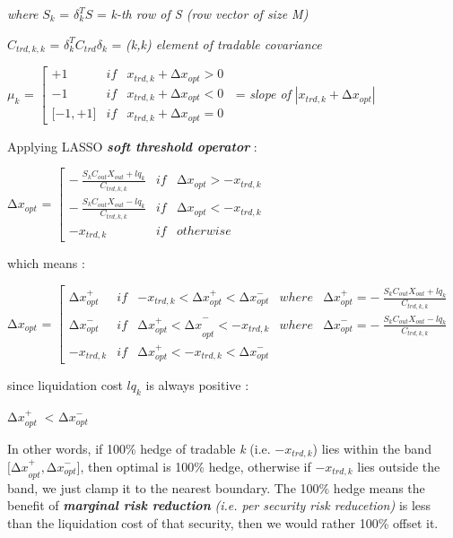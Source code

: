\emph{where} \(S_{k}\) = \(\delta_{k}^{T}S\) = \emph{k-th row of S (row
vector of size M)}

\(C_{trd,k,k}\) = \(\delta_{k}^{T}C_{trd}\delta_{k}\) = \emph{(k,k)
element of tradable covariance}

\(\mu_{k}\) = \(\left\lbrack \begin{matrix}
 + 1 & if & x_{trd,k} + {\mathrm{\Delta}x}_{opt} > 0 \\
 - 1 & if & x_{trd,k} + {\mathrm{\Delta}x}_{opt} < 0 \\
\lbrack - 1, + 1\rbrack & if & x_{trd,k} + {\mathrm{\Delta}x}_{opt} = 0
\end{matrix} \right.\ \) = \emph{slope of}
\(\left| x_{trd,k} + {\mathrm{\Delta}x}_{opt} \right|\)

Applying LASSO \emph{\textbf{soft threshold operator}} :

\({\mathrm{\Delta}x}_{opt}\) = \(\left\lbrack \begin{matrix}
 - \ \frac{S_{k}C_{out}X_{out} + {lq}_{k}}{C_{trd,k,k}} & if & {\mathrm{\Delta}x}_{opt} > - x_{trd,k} \\
 - \ \frac{S_{k}C_{out}X_{out} - {lq}_{k}}{C_{trd,k,k}} & if & {\mathrm{\Delta}x}_{opt} < - x_{trd,k} \\
 - x_{trd,k} & if & otherwise
\end{matrix} \right.\ \)

which means :

\({\mathrm{\Delta}x}_{opt}\) = \(\left\lbrack \begin{matrix}
{\mathrm{\Delta}x}_{opt}^{+} & if & - x_{trd,k} < {\mathrm{\Delta}x}_{opt}^{+} < {\mathrm{\Delta}x}_{opt}^{-} & where & {\mathrm{\Delta}x}_{opt}^{+} = - \ \frac{S_{k}C_{out}X_{out} + {lq}_{k}}{C_{trd,k,k}} \\
{\mathrm{\Delta}x}_{opt}^{-} & if & {{\mathrm{\Delta}x}_{opt}^{+} < \mathrm{\Delta}x}_{opt}^{-} < - x_{trd,k} & where & {\mathrm{\Delta}x}_{opt}^{-} = - \ \frac{S_{k}C_{out}X_{out} - {lq}_{k}}{C_{trd,k,k}} \\
 - x_{trd,k} & if & {\mathrm{\Delta}x}_{opt}^{+} < - x_{trd,k} < {\mathrm{\Delta}x}_{opt}^{-} & & 
\end{matrix} \right.\ \)

since liquidation cost \({lq}_{k}\) is always positive :

\({\mathrm{\Delta}x}_{opt}^{+}\ \) \textless{}
\({\mathrm{\Delta}x}_{opt}^{-}\)

In other words, if 100\% hedge of tradable \emph{k} (i.e.
\(- x_{trd,k}\)) lies within the band
\({\lbrack\mathrm{\Delta}x}_{opt}^{+},{\mathrm{\Delta}x}_{opt}^{-}\rbrack\),
then optimal is 100\% hedge, otherwise if \(- x_{trd,k}\) lies outside
the band, we just clamp it to the nearest boundary. The 100\% hedge
means the benefit of \emph{\textbf{marginal risk reduction}} \emph{(i.e.
per security risk reducetion)} is less than the liquidation cost of that
security, then we would rather 100\% offset it.

